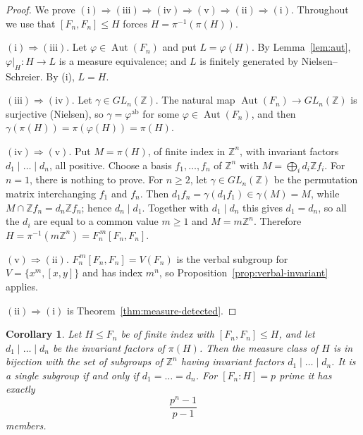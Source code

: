 \documentclass[11pt]{amsart}
\theoremstyle{plain}
\newtheorem{corollary}[theorem]{Corollary}
\theoremstyle{definition}
\newcommand{\Aut}{\operatorname{Aut}}
\begin{document}
\begin{proof}
We prove
$(\mathrm i)\Rightarrow(\mathrm{iii})\Rightarrow(\mathrm{iv})\Rightarrow(\mathrm v)
\Rightarrow(\mathrm{ii})\Rightarrow(\mathrm i)$.  Throughout we use that
$[F_n,F_n]\le H$ forces $H=\pi^{-1}(\pi(H))$.

$(\mathrm i)\Rightarrow(\mathrm{iii})$.  Let $\varphi\in\Aut(F_n)$ and put
$L=\varphi(H)$.  By Lemma~\ref{lem:aut}, $\varphi|_H\colon H\to L$ is a measure
equivalence; and $L$ is finitely generated by Nielsen--Schreier.  By (i), $L=H$.

$(\mathrm{iii})\Rightarrow(\mathrm{iv})$.  Let $\gamma\in GL_n(\mathbb Z)$.  The
natural map $\Aut(F_n)\to GL_n(\mathbb Z)$ is surjective (Nielsen), so
$\gamma=\varphi^{\mathrm{ab}}$ for some $\varphi\in\Aut(F_n)$, and then
$\gamma(\pi(H))=\pi(\varphi(H))=\pi(H)$.

$(\mathrm{iv})\Rightarrow(\mathrm v)$.  Put $M=\pi(H)$, of finite index in
$\mathbb Z^{n}$, with invariant factors $d_1\mid\dots\mid d_n$, all positive.
Choose a basis $f_1,\dots,f_n$ of $\mathbb Z^{n}$ with
$M=\bigoplus_{i}d_i\mathbb Z f_i$.  For $n=1$, there is nothing to prove.  For
$n\ge2$, let $\gamma\in GL_n(\mathbb Z)$ be the permutation matrix interchanging
$f_1$ and $f_n$.  Then $d_1f_n=\gamma(d_1f_1)\in\gamma(M)=M$, while
$M\cap\mathbb Z f_n=d_n\mathbb Z f_n$; hence $d_n\mid d_1$.  Together with
$d_1\mid d_n$ this gives $d_1=d_n$, so all the $d_i$ are equal to a common value
$m\ge1$ and $M=m\mathbb Z^{n}$.  Therefore
$H=\pi^{-1}(m\mathbb Z^{n})=F_n^{\,m}[F_n,F_n]$.

$(\mathrm v)\Rightarrow(\mathrm{ii})$.  $F_n^{\,m}[F_n,F_n]=V(F_n)$ is the verbal
subgroup for $V=\{x^{m},[x,y]\}$ and has index $m^{n}$, so
Proposition~\ref{prop:verbal-invariant} applies.

$(\mathrm{ii})\Rightarrow(\mathrm i)$ is Theorem~\ref{thm:measure-detected}.
\end{proof}

\begin{corollary}\label{cor:classsize}
Let $H\le F_n$ be of finite index with $[F_n,F_n]\le H$, and let
$d_1\mid\dots\mid d_n$ be the invariant factors of $\pi(H)$.  Then the measure
class of $H$ is in bijection with the set of subgroups of $\mathbb Z^{n}$ having
invariant factors $d_1\mid\dots\mid d_n$.  It is a single subgroup if and only if
$d_1=\dots=d_n$.  For $[F_n:H]=p$ prime it has exactly
\[
  \frac{p^{n}-1}{p-1}
\]
members.
\end{corollary}
\end{document}
